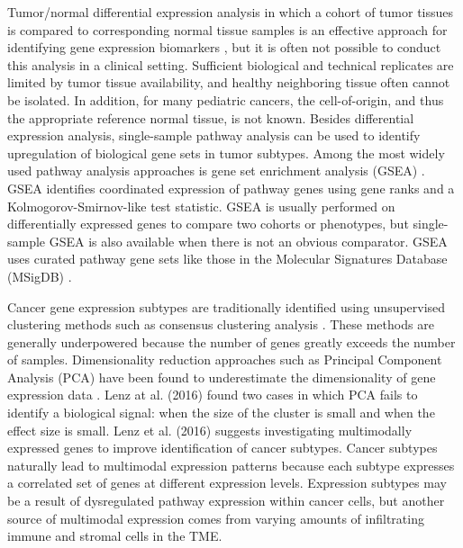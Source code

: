\documentclass[10pt,letterpaper]{article}
\begin{document}
Tumor/normal differential expression analysis in which a cohort of tumor tissues is compared to corresponding normal tissue samples is an effective approach for identifying gene expression biomarkers \cite{andersCountbasedDifferentialExpression2013, andersDifferentialExpressionAnalysis2010, sonesonComparisonMethodsDifferential2013}, but it is often not possible to conduct this analysis in a clinical setting. Sufficient biological and technical replicates are limited by tumor tissue availability, and healthy neighboring tissue often cannot be isolated. In addition, for many pediatric cancers, the cell-of-origin, and thus the appropriate reference normal tissue, is not known. Besides differential expression analysis, single-sample pathway analysis can be used to identify upregulation of biological gene sets in tumor subtypes. Among the most widely used pathway analysis approaches is gene set enrichment analysis (GSEA) \cite{subramanianGeneSetEnrichment2005, moothaPGC1alpharesponsiveGenesInvolved2003}. GSEA identifies coordinated expression of pathway genes using gene ranks and a Kolmogorov-Smirnov-like test statistic. GSEA is usually performed on differentially expressed genes to compare two cohorts or phenotypes, but single-sample GSEA is also available when there is not an obvious comparator. GSEA uses curated pathway gene sets like those in the Molecular Signatures Database (MSigDB) \cite{liberzonMolecularSignaturesDatabase2011}.

Cancer gene expression subtypes are traditionally identified using unsupervised clustering methods such as consensus clustering analysis \cite{oyeladeClusteringAlgorithmsTheir2016,johnM3CMonteCarlo2018,wilkersonConsensusClusterPlusClassDiscovery2010a}. These methods are generally underpowered because the number of genes greatly exceeds the number of samples. Dimensionality reduction approaches such as Principal Component Analysis (PCA) have been found to underestimate the dimensionality of gene expression data \cite{lenzPrincipalComponentsAnalysis2016}. Lenz at al. (2016) found two cases in which PCA fails to identify a biological signal: when the size of the cluster is small and when the effect size is small. Lenz et al. (2016) suggests investigating multimodally expressed genes to improve identification of cancer subtypes. Cancer subtypes naturally lead to multimodal expression patterns because each subtype expresses a correlated set of genes at different expression levels. Expression subtypes may be a result of dysregulated pathway expression within cancer cells, but another source of multimodal expression comes from varying amounts of infiltrating immune and stromal cells in the TME.
\end{document}
